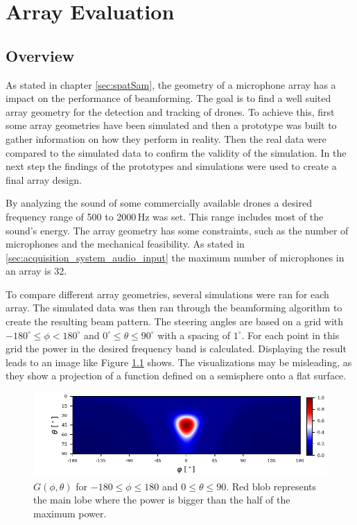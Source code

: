 \chapter{Array Evaluation}
\label{chap:aev}
\section{Overview}
As stated in chapter \ref{sec:spatSam}, the geometry of a microphone array
has a impact on the performance of beamforming.
The goal is to find a well suited array geometry for the detection and tracking of
drones.
To achieve this, first some array geometries have been simulated and then
a prototype was built to gather information on how they perform in reality.
Then the real data were compared to the simulated data to
confirm the validity of the simulation.
In the next step the findings of the prototypes and simulations
were used to create a final array design.

By analyzing the sound of some commercially available drones
a desired frequency range of 500 to 2000\,Hz was set.
This range includes most of the sound's energy.
The array geometry has some constraints,
such as the number of microphones and the mechanical feasibility.
As stated in \ref{sec:acquisition_system_audio_input} the maximum number
of microphones in an array is 32.

To compare different array geometries, several simulations
were ran for each array.
The simulated data was then ran through the beamforming
algorithm to create the resulting beam pattern.
The steering angles are based on a grid with $-180^\circ \leq \phi < 180^\circ$ and
$0^\circ \leq \theta \leq 90^\circ$ with a spacing of $1^\circ$.
For each point in this grid the power in the desired frequency band is calculated.
Displaying the result leads to an image like Figure \ref{aev:fig:gridEx} shows.
The visualizations may be misleading, as they show a projection of
a function defined on a semisphere onto a flat surface.
\begin{figure}[h]
	\centering
	\includegraphics[]{images/5_array_evaluation/0.3_0.79.pdf}
	\caption{$G(\phi, \theta)$ for $-180 \leq \phi \leq 180$ and $0 \leq \theta \leq 90$.
		Red blob represents the main lobe where the power is bigger than the half of the
		maximum power.}
	\label{aev:fig:gridEx}
\end{figure}


